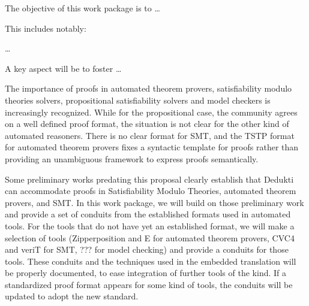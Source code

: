 \begin{workpackage}[id=atpetc,wphases=0-48,
  short=ATPs etc.,%
  title={ATP, SAT, SMT, Model checkers},
  lead=ULi,
  ULiRM=10]
  

\begin{wpobjectives}
  The objective of this work package is to \ldots

This includes notably:
  \begin{compactitem}
  \item \ldots
  \end{compactitem}
  A key aspect will be to foster \ldots
\end{wpobjectives}


\begin{wpdescription}

The importance of proofs in automated theorem provers, satisfiability
modulo theories solvers, propositional satisfiability solvers and
model checkers is increasingly recognized.  While for the
propositional case, the community agrees on a well defined proof
format, the situation is not clear for the other kind of automated
reasoners.  There is no clear format for SMT, and the TSTP format for
automated theorem provers fixes a syntactic template for proofs rather
than providing an unambiguous framework to express proofs
semantically.

Some preliminary works predating this proposal clearly establish that
Dedukti can accommodate proofs in Satisfiability Modulo Theories,
automated theorem provers, and SMT.  In this work package, we will
build on those preliminary work and provide a set of conduits from the
established formats used in automated tools. For the tools that do not
have yet an established format, we will make a selection of tools
(Zipperposition and E for automated theorem provers, CVC4 and veriT
for SMT, ??? for model checking) and provide a conduits for those
tools.  These conduits and the techniques used in the embedded
translation will be properly documented, to ease integration of
further tools of the kind.  If a standardized proof format appears for
some kind of tools, the conduits will be updated to adopt the new
standard.


\end{wpdescription}
\end{workpackage}
